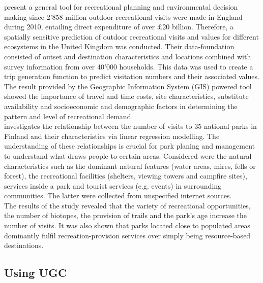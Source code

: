 \textcite{Sen2014} present a general tool for recreational planning and environmental decision making since 2'858 million outdoor recreational visits were made in England during 2010, entailing direct expenditure of over $£$20 billion. Therefore, a spatially sensitive prediction of outdoor recreational visits and values for different ecosystems in the United Kingdom was conducted. Their data-foundation consisted of outset and destination characteristics and locations combined with survey information from over 40'000 households. This data was used to create a trip generation function to predict visitation numbers and their associated values.\\
The result provided by the Geographic Information System (GIS) powered tool showed the importance of travel and time costs, site characteristics, substitute availability and socioeconomic and demographic factors in determining the pattern and level of recreational demand. \\

\textcite{Neuvonen2010} investigates the relationship between the number of visits to 35 national parks in Finland and their characteristics via linear regression modelling. The understanding of these relationships is crucial for park planing and management to understand what draws people to certain areas. Considered were the natural characteristics such as the dominant natural features (water areas, mires, fells or forest), the recreational facilities (shelters, viewing towers and campfire sites), services inside a park and tourist services (e.g. events) in surrounding communities. The latter were collected from unspecified internet sources.\\
The results of the study revealed that the variety of recreational opportunities, the number of biotopes, the provision of trails and the park's age increase the number of visits. It was also shown that parks located close to populated areas dominantly fulfil recreation-provision services over simply being resource-based destinations.

\subsection{Using UGC} 

